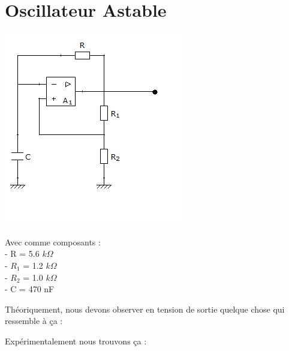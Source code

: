 \documentclass[11pt,a4paper]{article}
\begin{document}
\vfill\eject

\section{Oscillateur Astable}

\begin{multicols}{2}
\includegraphics[scale=0.6]{circuit1}

\columnbreak

Avec comme composants : \\
- R = 5.6 $k \Omega$\\
- $R_1$ = 1.2 $k \Omega$\\
- $R_2$ = 1.0 $k \Omega$\\
- C = 470 nF\\

\end{multicols}

\begin{multicols}{2}

Théoriquement, nous devons observer en tension de sortie quelque chose qui \\ ressemble à ça :

\columnbreak

Expérimentalement nous trouvons ça :

\end{multicols}
\end{document}
